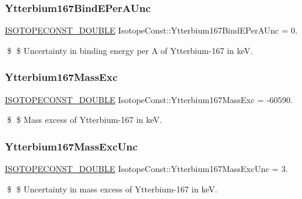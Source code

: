 \subsubsection{\texorpdfstring{Ytterbium167\+Bind\+E\+Per\+A\+Unc}{Ytterbium167BindEPerAUnc}}
{\footnotesize\ttfamily \mbox{\hyperlink{group___isotope_const-_macros_ga8f45a7272ce02c0b4c65c44636ed719a}{I\+S\+O\+T\+O\+P\+E\+C\+O\+N\+S\+T\+\_\+\+D\+O\+U\+B\+LE}} Isotope\+Const\+::\+Ytterbium167\+Bind\+E\+Per\+A\+Unc = 0.}

\$ \$ Uncertainty in binding energy per A of Ytterbium-\/167 in keV. \mbox{\label{group___isotope_const-_ytterbium-_yb167_gaa666070d349bf7182b87248944cecaee}} 
\subsubsection{\texorpdfstring{Ytterbium167\+Mass\+Exc}{Ytterbium167MassExc}}
{\footnotesize\ttfamily \mbox{\hyperlink{group___isotope_const-_macros_ga8f45a7272ce02c0b4c65c44636ed719a}{I\+S\+O\+T\+O\+P\+E\+C\+O\+N\+S\+T\+\_\+\+D\+O\+U\+B\+LE}} Isotope\+Const\+::\+Ytterbium167\+Mass\+Exc = -\/60590.}

\$ \$ Mass excess of Ytterbium-\/167 in keV. \mbox{\label{group___isotope_const-_ytterbium-_yb167_gab6dfe50001ebcd05ef691e661cdf898f}} 
\subsubsection{\texorpdfstring{Ytterbium167\+Mass\+Exc\+Unc}{Ytterbium167MassExcUnc}}
{\footnotesize\ttfamily \mbox{\hyperlink{group___isotope_const-_macros_ga8f45a7272ce02c0b4c65c44636ed719a}{I\+S\+O\+T\+O\+P\+E\+C\+O\+N\+S\+T\+\_\+\+D\+O\+U\+B\+LE}} Isotope\+Const\+::\+Ytterbium167\+Mass\+Exc\+Unc = 3.}

\$ \$ Uncertainty in mass excess of Ytterbium-\/167 in keV. \mbox{\label{group___isotope_const-_ytterbium-_yb167_ga2ce57c9be57771126f4f1aa5e88ab78b}} 
